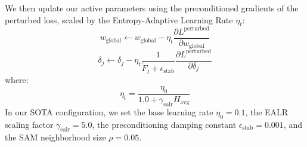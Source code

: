 \documentclass{article}
\theoremstyle{plain}
\theoremstyle{definition}
\theoremstyle{remark}
\begin{document}
We then update our active parameters using the preconditioned gradients of the perturbed loss, scaled by the Entropy-Adaptive Learning Rate $\eta_t$:
\begin{equation}
w_{\text{global}} \leftarrow w_{\text{global}} - \eta_t \frac{\partial L^{\text{perturbed}}}{\partial w_{\text{global}}}
\end{equation}
\begin{equation}
\delta_j \leftarrow \delta_j - \eta_t \frac{1}{\tilde{F}_j + \epsilon_{\text{stab}}} \frac{\partial L^{\text{perturbed}}}{\partial \delta_j}
\end{equation}
where:
\begin{equation}
\eta_t = \frac{\eta_0}{1.0 + \gamma_{\text{ealr}} H_{\text{avg}}}
\end{equation}
In our SOTA configuration, we set the base learning rate $\eta_0 = 0.1$, the EALR scaling factor $\gamma_{\text{ealr}} = 5.0$, the preconditioning damping constant $\epsilon_{\text{stab}} = 0.001$, and the SAM neighborhood size $\rho = 0.05$.
\end{document}
